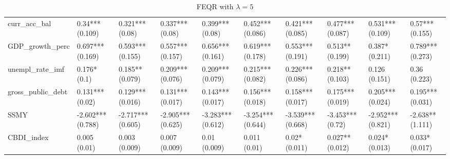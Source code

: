 \begin{table}[H]
\begin{subtable}[c]{\textwidth}
{\begin{tabular}{llllllllll}
  curr\_acc\_bal & 0.34*** (0.109) & 0.321*** (0.08) & 0.337*** (0.08) & 0.399*** (0.08) & 0.452*** (0.086) & 0.421*** (0.085) & 0.477*** (0.087) & 0.531*** (0.109) & 0.57*** (0.155) \\ 
  GDP\_growth\_perc & 0.697*** (0.169) & 0.593*** (0.155) & 0.557*** (0.157) & 0.656*** (0.161) & 0.619*** (0.178) & 0.553*** (0.191) & 0.513** (0.199) & 0.387* (0.211) & 0.789*** (0.273) \\ 
  unempl\_rate\_imf & 0.176* (0.1) & 0.185** (0.079) & 0.209*** (0.076) & 0.209*** (0.079) & 0.215*** (0.082) & 0.226*** (0.086) & 0.218** (0.103) & 0.126 (0.151) & 0.36 (0.223) \\ 
  gross\_public\_debt & 0.131*** (0.02) & 0.129*** (0.016) & 0.131*** (0.017) & 0.143*** (0.017) & 0.156*** (0.018) & 0.158*** (0.017) & 0.175*** (0.019) & 0.205*** (0.024) & 0.195*** (0.031) \\ 
  SSMY & -2.602*** (0.788) & -2.717*** (0.605) & -2.905*** (0.625) & -3.283*** (0.612) & -3.254*** (0.644) & -3.539*** (0.668) & -3.453*** (0.72) & -2.952*** (0.821) & -2.638** (1.111) \\ 
  CBDI\_index & 0.005 (0.01) & 0.003 (0.009) & 0.007 (0.009) & 0.01 (0.009) & 0.011 (0.01) & 0.02* (0.011) & 0.027** (0.012) & 0.024* (0.013) & 0.033* (0.017) \\ 
   \bottomrule
\end{tabular}}
\end{subtable}
\\
\begin{subtable}[c]{\textwidth}
\caption{FEQR with $\lambda = 5$}
\centering
{}
\end{subtable}
\end{table}
